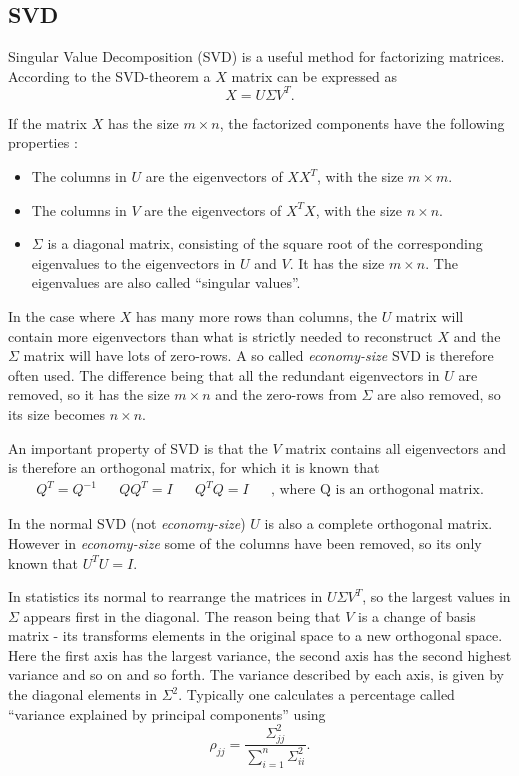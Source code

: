 \subsection{SVD}
Singular Value Decomposition (SVD) is a useful method for factorizing matrices. According to the SVD-theorem a $X$ matrix can be expressed as
\begin{equation}
X=U \Sigma V^{T}.
\label{eq:theory-svd}
\end{equation}

If the matrix $X$ has the size $m \times n$, the factorized components have the following properties \cite{introduction-to-data-mining}:
\begin{itemize}
\item The columns in $U$ are the eigenvectors of $X X^T$, with the size $m \times m$.
\item The columns in $V$ are the eigenvectors of $X^T X$, with the size $n \times n$.
\item $\Sigma$ is a diagonal matrix, consisting of the square root of the corresponding eigenvalues to the eigenvectors in $U$ and $V$.
It has the size $m \times n$. The eigenvalues are also called ``singular values''.
\end{itemize}

In the case where $X$ has many more rows than columns, the $U$ matrix will contain more eigenvectors than what is strictly needed to reconstruct $X$ and the $\Sigma$ matrix will have lots of zero-rows.
A so called \textit{economy-size} SVD is therefore often used.
The difference being that all the redundant eigenvectors in $U$ are removed, so it has the size $m \times n$ and the zero-rows from $\Sigma$ are also removed, so its size becomes $n \times n$.

An important property of SVD is that the $V$ matrix contains all eigenvectors and is therefore an orthogonal matrix, for which it is known that
\begin{align}
Q^T = Q^{-1} && Q Q^T = I && Q^T Q = I && \text{, where Q is an orthogonal matrix.}
\end{align}

In the normal SVD (not \textit{economy-size}) $U$ is also a complete orthogonal matrix.
However in \textit{economy-size} some of the columns have been removed, so its only known that $U^T U = I$.

In statistics its normal to rearrange the matrices in $U \Sigma V^T$, so the largest values in $\Sigma$ appears first in the diagonal.
The reason being that $V$ is a change of basis matrix - its transforms elements in the original space to a new orthogonal space.
Here the first axis has the largest variance, the second axis has the second highest variance and so on and so forth.
The variance described by each axis, is given by the diagonal elements in $\Sigma^2$.
Typically one calculates a percentage called ``variance explained by principal components'' using
\begin{equation}
\rho_{jj} = \frac{\Sigma^2_{jj}}{\sum_{i=1}^n \Sigma^2_{ii}}.
\end{equation}


